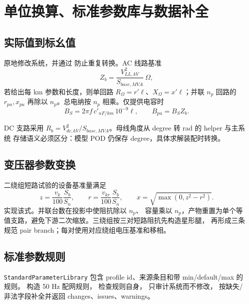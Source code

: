\section{单位换算、标准参数库与数据补全}

\subsection{实际值到标幺值}

 原地修改系统，并通过
 防止重复转换。AC 线路基准
\begin{equation}
Z_b=\frac{V_{LL,kV}^2}{S_{base,MVA}}\ \Omega,
\end{equation}
若给出每 km 参数和长度，则单回路 $R_\Omega=r'\ell$、$X_\Omega=x'\ell$；并联 $n_p$ 回路的
$r_{pu},x_{pu}$ 再除以 $n_p$。总电纳按 $n_p$ 相乘。仅提供电容时
\begin{equation}
B_S=2\pi f\,c'_{nF/km}\,10^{-9}\ell,\qquad B_{pu}=B_SZ_b.
\end{equation}

DC 支路采用 $R_b=V_{dc,kV}^2/S_{base,MVA}$。母线角度从 degree 转 rad 的 helper 与主系统
 存储语义必须区分：模型 POD 仍保存 degree，具体求解装配时转换。

\subsection{变压器参数变换}

二绕组短路试验的设备基准量满足
\begin{equation}
z=\frac{v_k}{100}\frac{S_b}{S_n},\qquad
r=\frac{v_{kr}}{100}\frac{S_b}{S_n},\qquad
x=\sqrt{\max(0,z^2-r^2)}.
\end{equation}
 实现该式。并联台数在投影中使阻抗除以 $n_p$、
容量乘以 $n_p$，产物重置为单个等值支路，避免下游二次缩放。三绕组按三对短路阻抗先构造星形腿，
再形成三条规范 pair branch；每对使用对应绕组电压基准和移相。

\subsection{标准参数规则}

\texttt{StandardParameterLibrary} 包含 profile id、来源条目和带 min/default/max 的规则。
 构造 50 Hz 配网规则，
 检查规则自身，
 只审计系统而不修改，
 按缺失/非法字段补全并返回 changes、issues、warnings。

